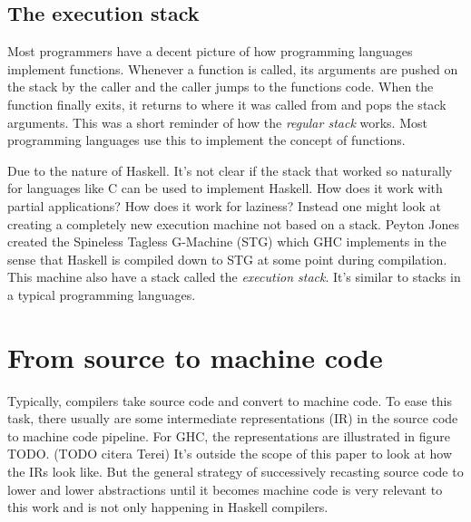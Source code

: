 \subsection{The execution stack}

Most programmers have a decent picture of how programming languages
implement functions. Whenever a function is called, its arguments are
pushed on the stack by the caller and the caller jumps to the functions
code. When the function finally exits, it returns to where it was called
from and pops the stack arguments. This was a short reminder of how
the \emph{regular stack} works. Most programming languages use this to
implement the concept of functions.

Due to the nature of Haskell. It's not clear if the stack that
worked so naturally for languages like C can be used to implement
Haskell. How does it work with partial applications? How does it
work for laziness? Instead one might look at creating a completely
new execution machine not based on a stack. Peyton Jones created the
Spineless Tagless G-Machine (STG) \cite{stg_1992} which GHC implements
\cite{evalapplyjfp06} in the sense that Haskell is compiled down to
STG at some point during compilation. This machine also have a stack
called the \emph{execution stack}. It's similar to stacks in a typical
programming languages.




\section{From source to machine code}

Typically, compilers take source code and convert to machine code. To ease this
task, there usually are some intermediate representations (IR) in the source
code to machine code pipeline.  For GHC, the representations are illustrated in
figure TODO.  (TODO citera Terei)
It's outside the scope of this paper to look at how the IRs
look like. But the general strategy of successively recasting source code to lower and
lower abstractions until it becomes machine code is very relevant to this work
and is not only happening in Haskell compilers. \cite[p.358]{aho2007compilers}

